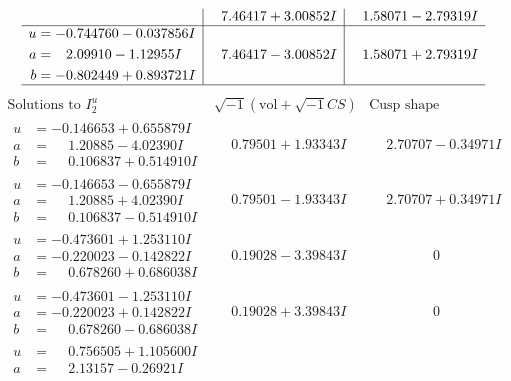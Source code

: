 \documentclass[1p]{elsarticle_modified}
\theoremstyle{definition}
\newcommand{\I}{\sqrt{-1}}
\begin{document}
$$\begin{array}{c|c|c}
 & \phantom{-}7.46417 + 3.00852 I & \phantom{-}1.58071 - 2.79319 I \\ \hline\begin{aligned}
u &= -0.744760 - 0.037856 I \\
a &= \phantom{-}2.09910 - 1.12955 I \\
b &= -0.802449 + 0.893721 I\end{aligned}
 & \phantom{-}7.46417 - 3.00852 I & \phantom{-}1.58071 + 2.79319 I\\
 \hline 
 \end{array}$$\newpage$$\begin{array}{c|c|c}  
\text{Solutions to }I^u_{2}& \I (\text{vol} + \sqrt{-1}CS) & \text{Cusp shape}\\
 \hline 
\begin{aligned}
u &= -0.146653 + 0.655879 I \\
a &= \phantom{-}1.20885 - 4.02390 I \\
b &= \phantom{-}0.106837 + 0.514910 I\end{aligned}
 & \phantom{-}0.79501 + 1.93343 I & \phantom{-}2.70707 - 0.34971 I \\ \hline\begin{aligned}
u &= -0.146653 - 0.655879 I \\
a &= \phantom{-}1.20885 + 4.02390 I \\
b &= \phantom{-}0.106837 - 0.514910 I\end{aligned}
 & \phantom{-}0.79501 - 1.93343 I & \phantom{-}2.70707 + 0.34971 I \\ \hline\begin{aligned}
u &= -0.473601 + 1.253110 I \\
a &= -0.220023 - 0.142822 I \\
b &= \phantom{-}0.678260 + 0.686038 I\end{aligned}
 & \phantom{-}0.19028 - 3.39843 I & \phantom{-0.000000 } 0 \\ \hline\begin{aligned}
u &= -0.473601 - 1.253110 I \\
a &= -0.220023 + 0.142822 I \\
b &= \phantom{-}0.678260 - 0.686038 I\end{aligned}
 & \phantom{-}0.19028 + 3.39843 I & \phantom{-0.000000 } 0 \\ \hline\begin{aligned}
u &= \phantom{-}0.756505 + 1.105600 I \\
a &= \phantom{-}2.13157 - 0.26921 I \\

\end{aligned}
\end{array}$$
\end{document}
